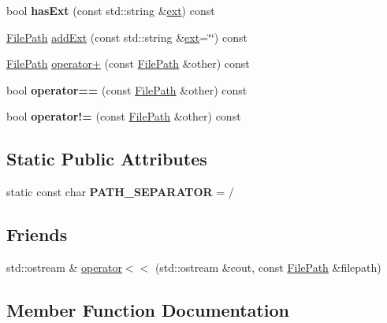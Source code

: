 \begin{DoxyCompactItemize}
bool {\bfseries has\+Ext} (const std\+::string \&\hyperlink{classglimac_1_1FilePath_ac36e170d0864ed2c5f1296dac2104b15}{ext}) const
\item 
\hyperlink{classglimac_1_1FilePath}{File\+Path} \hyperlink{classglimac_1_1FilePath_a4167275bb9a0239906a089a0c682ff37}{add\+Ext} (const std\+::string \&\hyperlink{classglimac_1_1FilePath_ac36e170d0864ed2c5f1296dac2104b15}{ext}=\char`\"{}\char`\"{}) const
\item 
\hyperlink{classglimac_1_1FilePath}{File\+Path} \hyperlink{classglimac_1_1FilePath_a8113825c73d8a8f1f1cf3ca57de6bad8}{operator+} (const \hyperlink{classglimac_1_1FilePath}{File\+Path} \&other) const
\item 
\mbox{\label{classglimac_1_1FilePath_a1d7c3a1f124fe5e637d7584a46ceef91}} 
bool {\bfseries operator==} (const \hyperlink{classglimac_1_1FilePath}{File\+Path} \&other) const
\item 
\mbox{\label{classglimac_1_1FilePath_aa1806dd19789add295b934e4ab52b296}} 
bool {\bfseries operator!=} (const \hyperlink{classglimac_1_1FilePath}{File\+Path} \&other) const
\end{DoxyCompactItemize}
\subsection*{Static Public Attributes}
\begin{DoxyCompactItemize}
\item 
\mbox{\label{classglimac_1_1FilePath_a011d614268133b82be0d0596e15a4648}} 
static const char {\bfseries P\+A\+T\+H\+\_\+\+S\+E\+P\+A\+R\+A\+T\+OR} = \textquotesingle{}/\textquotesingle{}
\end{DoxyCompactItemize}
\subsection*{Friends}
\begin{DoxyCompactItemize}
\item 
std\+::ostream \& \hyperlink{classglimac_1_1FilePath_a924c4e68c4618cf40156646d23ec5f1c}{operator$<$$<$} (std\+::ostream \&cout, const \hyperlink{classglimac_1_1FilePath}{File\+Path} \&filepath)
\end{DoxyCompactItemize}


\subsection{Member Function Documentation}
\mbox{\label{classglimac_1_1FilePath_a4167275bb9a0239906a089a0c682ff37}} 
